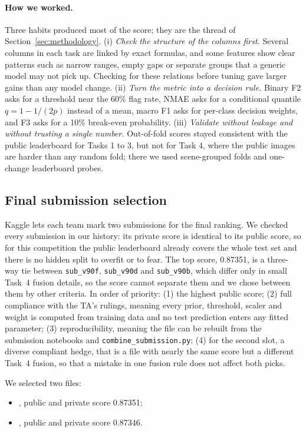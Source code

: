 \paragraph{How we worked.} Three habits produced most of the score; they are the thread of Section~\ref{sec:methodology}. (i) \emph{Check the structure of the columns first.} Several columns in each task are linked by exact formulas, and some features show clear patterns such as narrow ranges, empty gaps or separate groups that a generic model may not pick up. Checking for these relations before tuning gave larger gains than any model change. (ii) \emph{Turn the metric into a decision rule.} Binary F2 asks for a threshold near the 60\% flag rate, NMAE asks for a conditional quantile $q=1-1/(2p)$ instead of a mean, macro F1 asks for per-class decision weights, and F3 asks for a 10\% break-even probability. (iii) \emph{Validate without leakage and without trusting a single number.} Out-of-fold scores stayed consistent with the public leaderboard for Tasks 1 to 3, but not for Task 4, where the public images are harder than any random fold; there we used scene-grouped folds and one-change leaderboard probes.

\subsection*{Final submission selection}
\label{sec:final-selection}
Kaggle lets each team mark two submissions for the final ranking. We checked every submission in our history: its private score is identical to its public score, so for this competition the public leaderboard already covers the whole test set and there is no hidden split to overfit or to fear. The top score, 0.87351, is a three-way tie between \texttt{sub\_v90f}, \texttt{sub\_v90d} and \texttt{sub\_v90b}, which differ only in small Task~4 fusion details, so the score cannot separate them and we chose between them by other criteria. In order of priority: (1) the highest public score; (2) full compliance with the TA's rulings, meaning every prior, threshold, scaler and weight is computed from training data and no test prediction enters any fitted parameter; (3) reproducibility, meaning the file can be rebuilt from the submission notebooks and \texttt{combine\_submission.py}; (4) for the second slot, a diverse compliant hedge, that is a file with nearly the same score but a different Task~4 fusion, so that a mistake in one fusion rule does not affect both picks.

We selected two files:
\begin{itemize}[leftmargin=*,itemsep=1pt]
\item {}, public and private score 0.87351;
\item {}, public and private score 0.87346.
\end{itemize}

